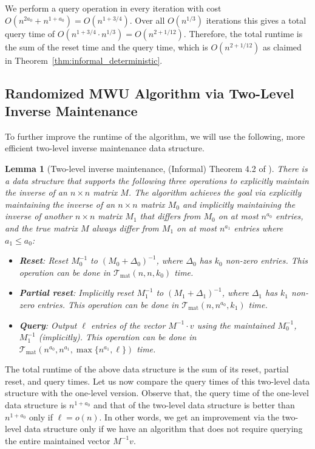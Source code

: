 \documentclass[11pt]{article}
\newtheorem{lemma}[theorem]{Lemma}
\newcommand{\Tmat}{\mathcal{T}_{\mathrm{mat}}}
\begin{document}
We perform a query operation in every iteration with cost $O(n^{2 a_0} + n^{1 + a_0}) = O(n^{1 + 3/4})$. Over all $O(n^{1/3})$ iterations this gives a total query time of $O(n^{1 + 3/4} \cdot n^{1/3}) = O(n^{2 + 1/12})$. Therefore, the total runtime is the sum of the reset time and the query time, which is $O(n^{2 + 1/12})$ as claimed in Theorem~\ref{thm:informal_deterministic}.


\subsection{Randomized MWU Algorithm via Two-Level Inverse Maintenance}
To further improve the runtime of the algorithm, we will use the following, more efficient two-level inverse maintenance data structure.
\begin{lemma}[Two-level inverse maintenance, (Informal) Theorem 4.2 of \cite{bns19}]
\label{lem:InverseMaintenanceTwoLevelShort}
There is a data structure that supports the following three operations to explicitly maintain the inverse of an $n \times n$ matrix $M$. The algorithm achieves the goal via explicitly maintaining the inverse of an $n \times n$ matrix $M_0$ and implicitly maintaining the inverse of another $n \times n$ matrix $M_1$ that differs from $M_0$ on at most $n^{a_0}$ entries, and the true matrix $M$ always differ from $M_1$ on at most $n^{a_1}$ entries where $a_1 \leq a_0$:
\begin{itemize}
\item {\bf Reset}: Reset $M_0^{-1}$ to $(M_0+\Delta_0)^{-1}$, where $\Delta_0$ has $k_0$ non-zero entries. This operation can be done in $\Tmat(n, n, k_0)$ time.
\item {\bf Partial reset}: Implicitly reset $M_1^{-1}$ to $(M_1+\Delta_1)^{-1}$, where $\Delta_1$ has $k_1$ non-zero entries. This operation can be done in $\Tmat(n, n^{a_0}, k_1)$ time.
\item {\bf Query}: Output $\ell$ entries of the vector $M^{-1} \cdot v$ using the maintained $M_0^{-1}$, $M_1^{-1}$ (implicitly). 
This operation can be done in $\Tmat(n^{a_0}, n^{a_1}, \max\{n^{a_1}, \ell\})$ time.
\end{itemize}
\end{lemma}
The total runtime of the above data structure is the sum of its reset, partial reset, and query times. Let us now compare the query times of this two-level data structure with the one-level version. Observe that, the query time of the one-level data structure is $n^{1+a_0}$ and that of the two-level data structure is better than $ n^{1+a_0}$ only if $\ell = o(n)$. In other words, we get an improvement via the two-level data structure only if we have an algorithm that does not require querying the entire maintained vector $M^{-1}v$.
\end{document}
